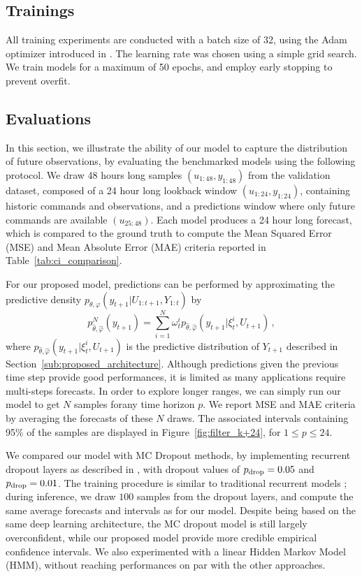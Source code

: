 \documentclass[journal]{IEEEtran}
\begin{document}
\subsection{Trainings}
\label{sub:trainings}
All training experiments are conducted with a batch size of 32, using the Adam optimizer introduced in \cite{Kingma2015AdamAM}.
The learning rate was chosen using a simple grid search.
We train models for a maximum of 50 epochs, and employ early stopping to prevent overfit.

\subsection{Evaluations}%
\label{sub:evaluations}

In this section, we illustrate the ability of our model to capture the distribution of future observations, by evaluating the benchmarked models using the following protocol. We draw 48 hours long samples $(u_{1:48}, y_{1:48})$ from the validation dataset, composed of a 24 hour long lookback window $(u_{1:24}, y_{1:24})$, containing historic commands and observations, and a predictions window where only future commands are available $(u_{25:48})$.
Each model produces a 24 hour long forecast, which is compared to the ground truth to compute the Mean Squared Error (MSE) and Mean Absolute Error (MAE) criteria reported in Table~\ref{tab:ci_comparison}. %

For our proposed model, predictions can be performed by approximating the predictive density $p_{\theta,\varphi}(y_{t+1}|U_{1:t+1},Y_{1:t})$ by
$$
	p^N_{\widehat\theta,\widehat\varphi}(y_{t+1})= \sum_{i=1}^{N}\omega_t^i p_{\widehat\theta,\widehat\varphi}(y_{t+1}|\xi_t^i,U_{t+1})\,,
$$
where $ p_{\widehat\theta,\widehat\varphi}(y_{t+1}|\xi_t^i,U_{t+1})$ is the predictive distribution of $Y_{t+1}$ described in Section~\ref{sub:proposed_architecture}.
Although predictions given the previous time step provide good performances, it is limited as many applications require multi-steps forecasts.
In order to explore longer ranges, we can simply run our model to get $N$ samples forany time horizon $p$.
We report MSE and MAE criteria by averaging the forecasts of these $N$ draws.
The associated intervals containing 95\% of the samples are displayed in Figure~\ref{fig:filter_k+24}, for $1\leq p \leq 24$.

We compared our model with MC Dropout methods, by implementing recurrent dropout layers as described in \cite{Gal2016NIPS}, with dropout values of $p_\textnormal{drop}=0.05$ and $p_\textnormal{drop}=0.01$.
The training procedure is similar to traditional recurrent models ; during inference, we draw $100$ samples from the dropout layers, and compute the same average forecasts and  intervals as for our model.
Despite being based on the same deep learning architecture, the MC dropout model is still largely overconfident, while our proposed model provide more credible empirical confidence intervals.
We also experimented with a linear Hidden Markov Model (HMM), without reaching performances on par with the other approaches.
\end{document}
